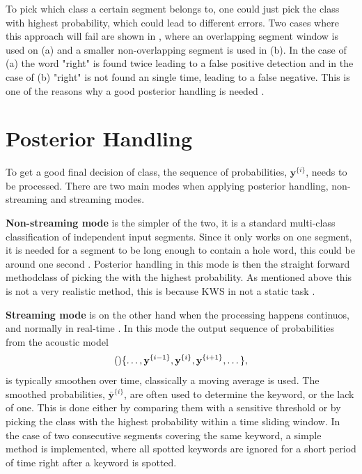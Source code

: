 To pick which class a certain segment belongs to, one could just pick the class with highest probability, which could lead to different errors. Two cases where this approach will fail are shown in , where an overlapping segment window is used on (a) and a smaller non-overlapping segment is used in (b). In the case of (a) the word "right" is found twice leading to a false positive detection and in the case of (b) "right" is not found an single time, leading to a false negative. This is one of the reasons why a good posterior handling is needed \cite{lopez2021deep}.

\section{Posterior Handling}
To get a good final decision of class, the sequence of probabilities, \(\textbf{y}^{\{i\}}\), needs to be processed. There are two main modes when applying posterior handling, non-streaming and streaming modes.

\textbf{Non-streaming mode} is the simpler of the two, it is a standard multi-class classification of independent input segments. Since it only works on one segment, it is needed for a segment to be long enough to contain a hole word, this could be around one second \cite{lopez2021deep}. Posterior handling in this mode is then the straight forward methodclass of picking the  with the highest probability. As mentioned above this is not a very realistic method, this is because KWS in not a static task \cite{lopez2021deep}.

\textbf{Streaming mode} is on the other hand when the processing happens continuos, and normally in real-time \cite{lopez2021deep}. In this mode the output sequence of probabilities from the acoustic model
\begin{align}
    \qty\{ \dots, \textbf{y}^{\{i-1\}}, \textbf{y}^{\{i\}}, \textbf{y}^{\{i+1\}}, \dots\},
\end{align}
is typically smoothen over time, classically a moving average is used. The smoothed probabilities, \(\bar{\textbf{y}}^{\{i\}}\), are often used to determine the keyword, or the lack of one. This is done either by comparing them with a sensitive threshold or by picking the class with the highest probability within a time sliding window. In the case of two consecutive segments covering the same keyword, a simple method is implemented, where all spotted keywords are ignored for a short period of time right after a keyword is spotted.
    